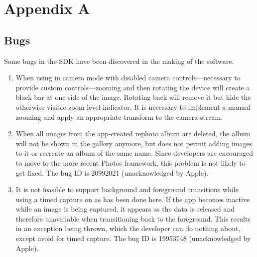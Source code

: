 \chapter{Appendix A}

\section{Bugs}

Some bugs in the SDK have been discovered in the making of the software.
\begin{enumerate}

   \item When using  in camera mode with disabled
      camera controls---necessary to provide custom controls---zooming and then
      rotating the device will create a black bar at one side of the image.
      Rotating back will remove it but hide the otherwise visible zoom level
      indicator. It is necessary to implement a manual zooming and apply an
      appropriate transform to the camera stream.

   \item When all images from the app-created rephoto album are deleted, the
      album will not be shown in the gallery anymore, but 
      does not permit adding images to it or recreate an album of the same name.
      Since developers are encouraged to move to the more recent Photos
      framework, this problem is not likely to get fixed. The bug ID is
      20992021 (unacknowledged by Apple).

   \item It is not feasible to support background and foreground transitions
      while using a timed capture on  as has been
      done here. If the app becomes inactive while an image is being captured,
      it appears as the data is released and therefore unavailable when
      transitioning back to the foreground. This results in an exception being
      thrown, which the developer can do nothing about, except avoid
       for timed capture. The bug ID is 19953748
      (unacknowledged by Apple).
\end{enumerate}
